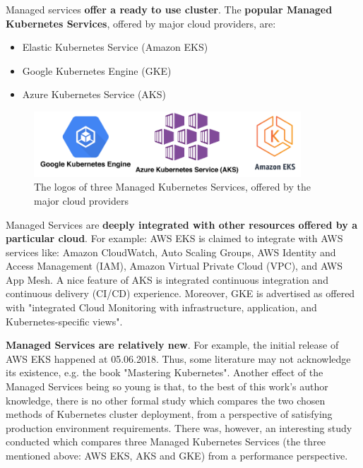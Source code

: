 Managed services \textbf{offer a ready to use cluster}. The \textbf{popular Managed Kubernetes Services}, offered by major cloud providers, are:
\begin{itemize}
\item Elastic Kubernetes Service (Amazon EKS)\cite{online-eks}
\item Google Kubernetes Engine (GKE)\cite{online-gke}
\item Azure Kubernetes Service (AKS)\cite{online-aks}
\end{itemize}

\begin{figure}[H]
    \centering
    \includegraphics[width=10cm]{figures/managed-k8s.png}
    \captionsetup{justification=centering,margin=2cm}
    \caption{The logos of three Managed Kubernetes Services, offered by the major cloud providers}
\end{figure}

Managed Services are \textbf{deeply integrated with other resources offered by a particular cloud}. For example: AWS EKS is claimed to integrate with AWS services like: Amazon CloudWatch, Auto Scaling Groups, AWS Identity and Access Management (IAM), Amazon Virtual Private Cloud (VPC), and AWS App Mesh\cite{online-eks}. A nice feature of AKS is integrated continuous integration and continuous delivery (CI/CD) experience\cite{online-aks}. Moreover, GKE is advertised as offered with "integrated Cloud Monitoring with infrastructure, application, and Kubernetes-specific views"\cite{online-gke}.

\textbf{Managed Services are relatively new}. For example, the initial release of AWS EKS happened at 05.06.2018\cite{eks-history}. Thus, some literature may not acknowledge its existence, e.g. the book "Mastering Kubernetes"\cite{book-mastering-k8s}. Another effect of the Managed Services being so young is that, to the best of this work's author knowledge, there is no other formal study which compares the two chosen methods of Kubernetes cluster deployment, from a perspective of satisfying production environment requirements. There was, however, an interesting study conducted which compares three Managed Kubernetes Services (the three mentioned above: AWS EKS, AKS and GKE) from a performance perspective\cite{article-managed}.

